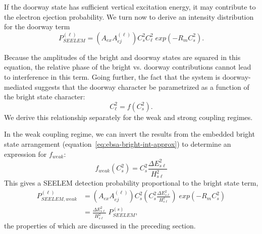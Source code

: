 \documentclass[12pt]{mitthesis}
\begin{document}
If the doorway state has sufficient vertical excitation energy,
it may contribute
to the electron ejection probability. We turn now to derive an
intensity distribution for the doorway term
\begin{equation}
  P_{SEELEM}^{(\ell)} = \left( A_{ex} A_{ej}^{(\ell)} \right) 
    C_s^2 C_\ell^2 \; exp \left( -R_m C_s^2 \right).
\end{equation}

Because the amplitudes of the bright and doorway states are squared in
this equation, the relative phase of the bright vs. doorway
contributions cannot lead to interference in this term. Going further, the
fact that the system is doorway-mediated suggests that the doorway
character be parametrized as a function of the bright state
character:
\begin{equation}
  C_{\ell}^2 = f(C_s^2).
\end{equation}
We derive this relationship separately for the weak and strong
coupling regimes.

In the weak coupling regime, we can invert the results from the
embedded bright state arrangement
(equation~\ref{eq:ebsa-bright-int-approx}) to determine an expression
for $f_{weak}$:
\begin{equation}
  f_{weak} \left ( C_s^2 \right ) = C_s^2 \frac{\Delta E_{s\ell}^2}{H_{s\ell}^2}
\end{equation}
This gives a SEELEM detection probability proportional to the bright
state term,
\begin{equation}
  \begin{split}
    P_{SEELEM, weak}^{(\ell)} &= 
    \left( A_{ex} A_{ej}^{(\ell)} \right) 
    C_s^2 \left ( C_s^2 \frac{\Delta E_{s\ell}^2}{H_{s\ell}^2} \right )
    \; exp \left( -R_m C_s^2 \right)\\
    &= \frac{\Delta E_{s\ell}^2}{H_{s\ell}^2} \; P_{SEELEM}^{(s)},
  \end{split}
\end{equation}
the properties of which are discussed in the preceding section.
\end{document}
